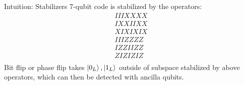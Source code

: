 \documentclass{beamer}
\begin{document}
\begin{frame}{Intuition: Stabilizers}
  7-qubit code is stabilized by the operators:
  \begin{equation*}
    \begin{matrix}
      IIIXXXX\\
      IXXIIXX\\
      XIXIXIX\\
      IIIZZZZ\\
      IZZIIZZ\\
      ZIZIZIZ\\
    \end{matrix}
  \end{equation*}
  Bit flip or phase flip takes $\left\vert{0_L}\right\rangle,\left\vert{1_L}\right\rangle$ outside of subspace stabilized by above operators, which can then be detected with ancilla qubits.
\end{frame}

\end{document}
